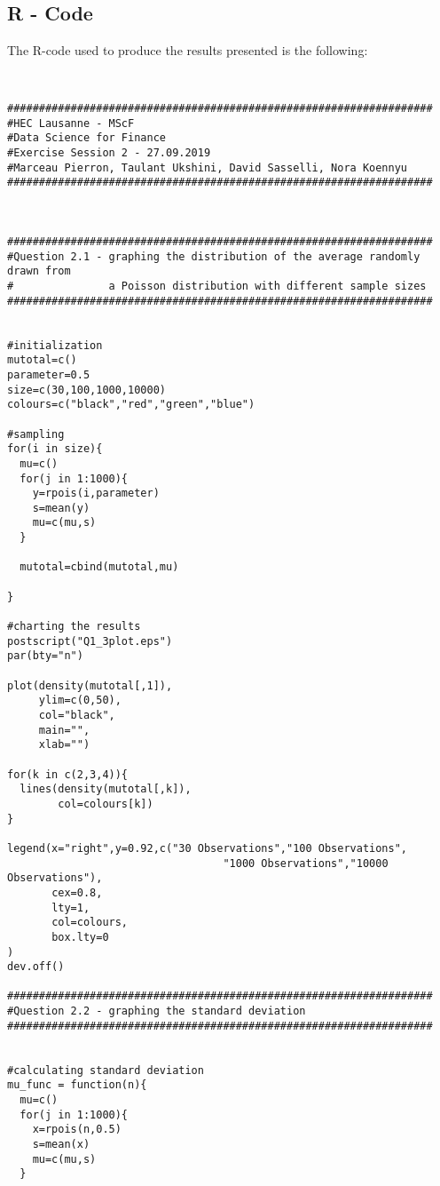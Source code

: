 \begin{appendices}

\chapter{R - Code}

The R-code used to produce the results presented is the following:

\begin{verbatim}


###################################################################
#HEC Lausanne - MScF
#Data Science for Finance
#Exercise Session 2 - 27.09.2019
#Marceau Pierron, Taulant Ukshini, David Sasselli, Nora Koennyu
###################################################################



###################################################################
#Question 2.1 - graphing the distribution of the average randomly drawn from
#               a Poisson distribution with different sample sizes
###################################################################


#initialization
mutotal=c()
parameter=0.5
size=c(30,100,1000,10000)
colours=c("black","red","green","blue")

#sampling
for(i in size){
  mu=c()
  for(j in 1:1000){
    y=rpois(i,parameter)
    s=mean(y)
    mu=c(mu,s)
  }
  
  mutotal=cbind(mutotal,mu)
  
}

#charting the results
postscript("Q1_3plot.eps")
par(bty="n")

plot(density(mutotal[,1]),
     ylim=c(0,50),
     col="black",
     main="",
     xlab="")

for(k in c(2,3,4)){
  lines(density(mutotal[,k]),
        col=colours[k])
}

legend(x="right",y=0.92,c("30 Observations","100 Observations",
                                  "1000 Observations","10000 Observations"),
       cex=0.8,
       lty=1,
       col=colours,
       box.lty=0
)
dev.off()

###################################################################
#Question 2.2 - graphing the standard deviation
###################################################################


#calculating standard deviation
mu_func = function(n){
  mu=c()
  for(j in 1:1000){
    x=rpois(n,0.5)
    s=mean(x)
    mu=c(mu,s)
  }
  

\end{verbatim}
\end{appendices}
